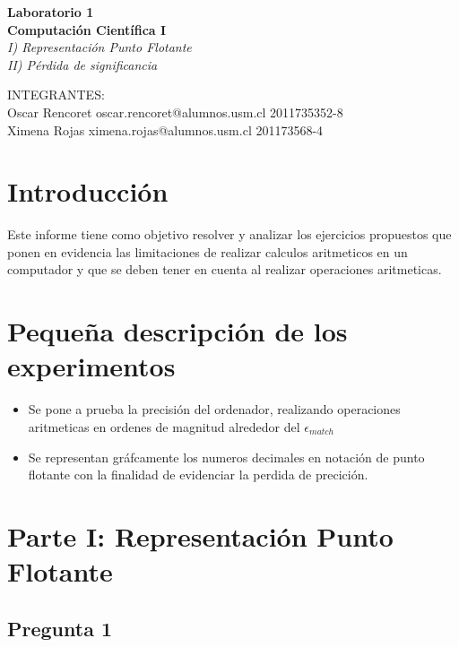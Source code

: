 \documentclass[10pt|letterpaper]{article}
\begin{document}
\begin{center}{
\huge\textbf{Laboratorio 1 \\ Computación Científica I}} \\
\bigskip
\textit{I) Representación Punto Flotante \\ II) Pérdida de significancia}

\vspace*{5.0 in}
\small{INTEGRANTES:} \\
\small{Oscar Rencoret oscar.rencoret@alumnos.usm.cl 2011735352-8} \\
\small{Ximena Rojas ximena.rojas@alumnos.usm.cl 201173568-4}
\end{center}

\newpage

\section{Introducción}
Este informe tiene como objetivo resolver y analizar los ejercicios propuestos que ponen en evidencia las limitaciones de realizar calculos aritmeticos en un computador y que se deben tener en cuenta al realizar operaciones aritmeticas.

\section{Pequeña descripción de los experimentos}
\begin{itemize}
\item Se pone a prueba la precisión del ordenador, realizando operaciones aritmeticas en ordenes de magnitud alrededor del $\epsilon_{match}$ 
\item Se representan gráfcamente los numeros decimales en notación de punto flotante con la finalidad de evidenciar la perdida de precición.
\end{itemize}

\section{Parte I: Representación Punto Flotante}

\subsection{Pregunta 1}
\end{document}
